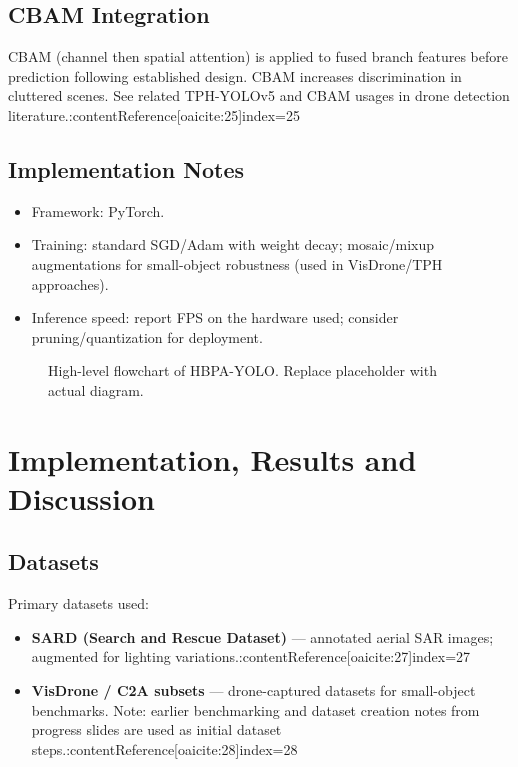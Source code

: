 \documentclass[12pt,a4paper]{report}
\begin{document}
\section{CBAM Integration}
CBAM (channel then spatial attention) is applied to fused branch features before prediction following established design. CBAM increases discrimination in cluttered scenes. See related TPH-YOLOv5 and CBAM usages in drone detection literature.:contentReference[oaicite:25]{index=25}

\section{Implementation Notes}
\begin{itemize}
  \item Framework: PyTorch.
  \item Training: standard SGD/Adam with weight decay; mosaic/mixup augmentations for small-object robustness (used in VisDrone/TPH approaches).
  \item Inference speed: report FPS on the hardware used; consider pruning/quantization for deployment.
\end{itemize}

\begin{figure}[ht]
\centering
{}
\caption{High-level flowchart of HBPA-YOLO. Replace placeholder with actual diagram.}
\label{fig:hbpa_flow}
\end{figure}

\chapter{Implementation, Results and Discussion}

\section{Datasets}
Primary datasets used:
\begin{itemize}
  \item \textbf{SARD (Search and Rescue Dataset)} — annotated aerial SAR images; augmented for lighting variations.:contentReference[oaicite:27]{index=27}
  \item \textbf{VisDrone / C2A subsets} — drone-captured datasets for small-object benchmarks. Note: earlier benchmarking and dataset creation notes from progress slides are used as initial dataset steps.:contentReference[oaicite:28]{index=28}
\end{itemize}
\end{document}
